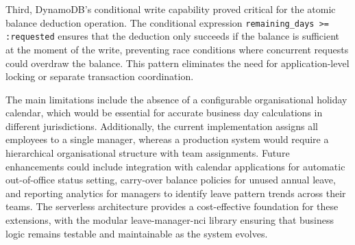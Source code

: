 \documentclass[conference]{IEEEtran}
\begin{document}
Third, DynamoDB's conditional write capability proved critical for the atomic balance deduction operation. The conditional expression \texttt{remaining\_days >= :requested} ensures that the deduction only succeeds if the balance is sufficient at the moment of the write, preventing race conditions where concurrent requests could overdraw the balance. This pattern eliminates the need for application-level locking or separate transaction coordination.

The main limitations include the absence of a configurable organisational holiday calendar, which would be essential for accurate business day calculations in different jurisdictions. Additionally, the current implementation assigns all employees to a single manager, whereas a production system would require a hierarchical organisational structure with team assignments. Future enhancements could include integration with calendar applications for automatic out-of-office status setting, carry-over balance policies for unused annual leave, and reporting analytics for managers to identify leave pattern trends across their teams. The serverless architecture provides a cost-effective foundation for these extensions, with the modular leave-manager-nci library ensuring that business logic remains testable and maintainable as the system evolves.
\end{document}
